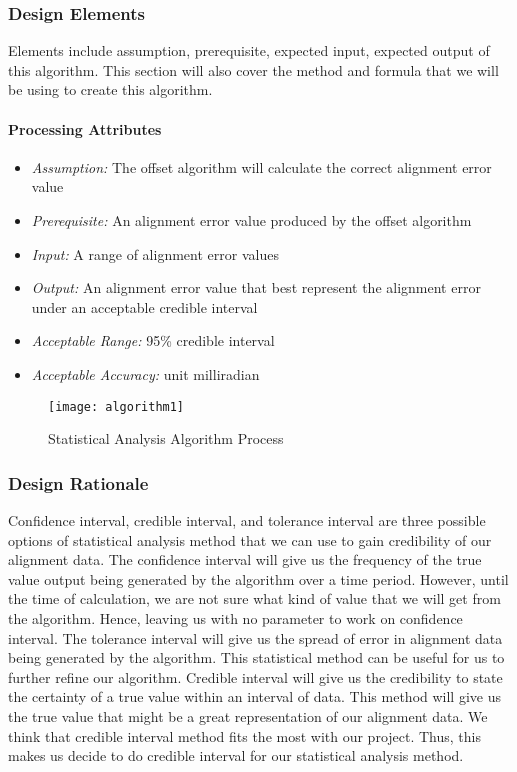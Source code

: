 	\subsubsection{Design Elements}
	Elements include assumption, prerequisite, expected input, expected output of this algorithm. This section will also cover the method and formula that we will be using to create this algorithm.

		\paragraph{Processing Attributes}
			\begin{itemize}
				\item \textit{Assumption:} The offset algorithm will calculate the correct alignment error value 
				\item \textit{Prerequisite:} An alignment error value produced by the offset algorithm 
				\item \textit{Input:} A range of alignment error values 
				\item \textit{Output:} An alignment error value that best represent the alignment error under an acceptable credible interval
				\item \textit{Acceptable Range:} 95\% credible interval 
				\item \textit{Acceptable Accuracy:} unit milliradian\\
			\end{itemize}

	\begin{figure}
		\centering
	 		\caption{Statistical Analysis Algorithm Process}			
	      	\texttt{[image: algorithm1]}
	    \label{fig:algorithm1}
	\end{figure}

	\subsubsection{Design Rationale}
	Confidence interval, credible interval, and tolerance interval are three possible options of statistical analysis method that we can use to gain credibility of our alignment data. The confidence interval will give us the frequency of the true value output being generated by the algorithm over a time period. However, until the time of calculation, we are not sure what kind of value that we will get from the algorithm. Hence, leaving us with no parameter to work on confidence interval. The tolerance interval will give us the spread of error in alignment data being generated by the algorithm. This statistical method can be useful for us to further refine our algorithm. Credible interval will give us the credibility to state the certainty of a true value within an interval of data. This method will give us the true value that might be a great representation of our alignment data. We think that credible interval method fits the most with our project. Thus, this makes us decide to do credible interval for our statistical analysis method.\\

